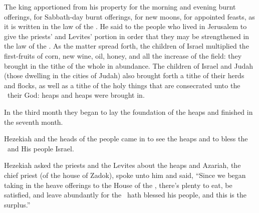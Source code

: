 \begin{inparaenum}
   The king apportioned from his property for the morning and evening burnt offerings, for Sabbath-day burnt offerings, for new moons, for appointed feasts, as it is written in the law of the \lord.%
   He said to the people who lived in Jerusalem to give the priests' and Levites' portion in order that they may be strengthened in the law of the \lord.%
   As the matter spread forth, the children of Israel multiplied the first-fruits of corn, new wine, oil, honey, and all the increase of the field: they brought in the tithe of the whole in abundance.%
   The children of Israel and Judah (those dwelling in the cities of Judah) also brought forth a tithe of their herds and flocks, as well as a tithe of the holy things that are consecrated unto the \lord\ their God: heaps and heaps were brought in.%

   In the third month they began to lay the foundation of the heaps and finished in the seventh month.%

   Hezekiah and the heads of the people came in to see the heaps and to bless the \lord\ and His people Israel.%

   Hezekiah asked the priests and the Levites about the heaps%
   and Azariah, the chief priest (of the house of Zadok), spoke unto him and said, ``Since we began taking in the heave offerings to the House of the \lord, there's plenty to eat, be satisfied, and leave abundantly for the \lord\ hath blessed his people, and this is the surplus.''%


\end{inparaenum}
